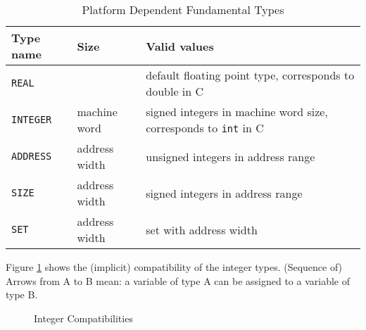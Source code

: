 \documentclass[a4wide,11pt]{article}
\newcommand{\SIGNED}{\lstinline"SIGNED"}
\newcommand{\UNSIGNED}{\lstinline"UNSIGNED"}
\begin{document}
\begin{table}[h!]
\centering
\begin{tabular}{|p{2cm}|p{3cm}|p{8cm}|}
\hline
Type name & Size & Valid values \\
\hline\hline
\verb"REAL" &  & default floating point type, \newline corresponds to double in C \\
\verb"INTEGER" & machine word & signed integers in machine word size, \newline corresponds to \verb"int" in C \\
\verb"ADDRESS" & address width & unsigned integers in address range\\
\verb"SIZE" & address width & signed integers in address range\\
\verb"SET" & address width & set with address width \\
\hline
\end{tabular}

\caption{Platform Dependent Fundamental Types}\label{table:BasicTypesPlatform}
\end{table}


Figure \ref{figure:base types compatibility} shows the (implicit) compatibility of the integer types. (Sequence of) Arrows from A to B mean: a variable of type A can be assigned to a variable of type B.

\begin{figure}[h!]
\begin{center}
\end{center}

\caption{Integer Compatibilities}\label{figure:base types compatibility}
\end{figure}
\end{document}
